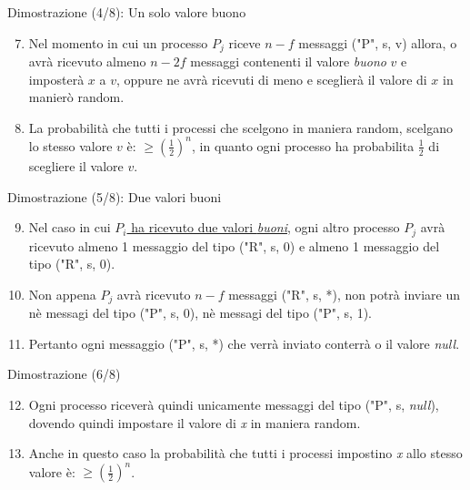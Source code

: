 \documentclass{beamer}
\begin{document}
\begin{frame}{Dimostrazione (4/8): Un solo valore buono}
    \begin{enumerate}
        \setcounter{enumi}{6}
        \item<1-> Nel momento in cui un processo $P_{j}$ riceve $n - f$ messaggi ("P", s, v) allora, o avrà ricevuto almeno $n - 2f$ messaggi contenenti il valore \textit{buono} $v$ e imposterà $x$ a $v$, oppure ne avrà ricevuti di meno e sceglierà il valore di $x$ in manierò random.
        \item<2-> La probabilità che tutti i processi che scelgono in maniera random, scelgano lo stesso valore $v$ è: $\geq (\frac{1}{2})^n$, in quanto ogni processo ha probabilita $\frac{1}{2}$ di scegliere il valore $v$.  
    \end{enumerate}
\end{frame}

\begin{frame}{Dimostrazione (5/8): Due valori buoni}
    \begin{enumerate}
        \setcounter{enumi}{8}
        \item<1-> Nel caso in cui \underline{$P_{i}$ ha ricevuto due valori \textit{buoni}}, ogni altro processo $P_{j}$ avrà ricevuto almeno 1 messaggio del tipo ("R", s, 0) e almeno 1 messaggio del tipo ("R", s, 0).
        \item<2-> Non appena $P_{j}$ avrà ricevuto $n - f$ messaggi ("R", s, *), non potrà inviare un nè messagi del tipo ("P", s, 0), nè messagi del tipo ("P", s, 1).
        \item<3-> Pertanto ogni messaggio ("P", s, *) che verrà inviato conterrà o il valore \textit{null}.
    \end{enumerate}
\end{frame}

\begin{frame}{Dimostrazione (6/8)}
    \begin{enumerate}
        \setcounter{enumi}{11}
        \item<1-> Ogni processo riceverà quindi unicamente messaggi del tipo ("P", s, \textit{null}), dovendo quindi impostare il valore di \textit{x} in maniera random.
        \item<2-> Anche in questo caso la probabilità che tutti i processi impostino \textit{x} allo stesso valore è: $\geq (\frac{1}{2})^n$.
    \end{enumerate}
\end{frame}
\end{document}
